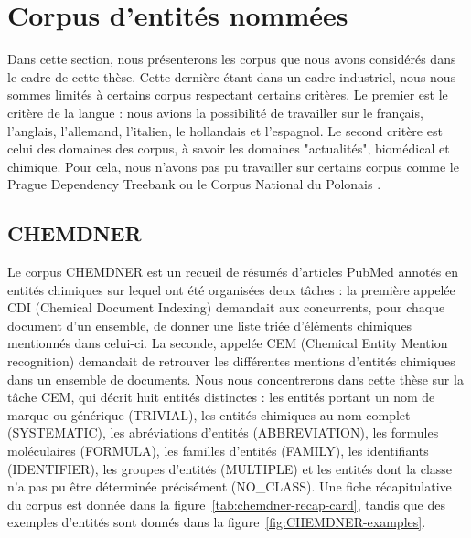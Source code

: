 \documentclass[12pt,a4paper,times,twoside,openright]{report}
\begin{document}
    
    \section{Corpus d'entités nommées}
    \label{sec:named-entity-corpora}
    
    Dans cette section, nous présenterons les corpus que nous avons considérés dans le cadre de cette thèse. Cette dernière étant dans un cadre industriel, nous nous sommes limités à certains corpus respectant certains critères. Le premier est le critère de la langue : nous avions la possibilité de travailler sur le français, l'anglais, l'allemand, l'italien, le hollandais et l'espagnol. Le second critère est celui des domaines des corpus, à savoir les domaines "actualités", biomédical et chimique. Pour cela, nous n'avons pas pu travailler sur certains corpus comme le Prague Dependency Treebank \citep{bejvcek2010annotation} ou le Corpus National du Polonais \citep{savary2010towards}.
    
        \subsection{CHEMDNER}
        \label{subsec:corpus-CHEMDNER}
Le corpus CHEMDNER \citep{krallinger2015chemdner} est un recueil de résumés d'articles PubMed annotés en entités chimiques sur lequel ont été organisées deux tâches : la première appelée CDI (Chemical Document Indexing) demandait aux concurrents, pour chaque document d'un ensemble, de donner une liste triée d'éléments chimiques mentionnés dans celui-ci. La seconde, appelée CEM (Chemical Entity Mention recognition) demandait de retrouver les différentes mentions d'entités chimiques dans un ensemble de documents. Nous nous concentrerons dans cette thèse sur la tâche CEM, qui décrit huit entités distinctes : les entités portant un nom de marque ou générique (TRIVIAL), les entités chimiques au nom complet (SYSTEMATIC), les abréviations d'entités (ABBREVIATION), les formules moléculaires (FORMULA), les familles d'entités (FAMILY), les identifiants (IDENTIFIER), les groupes d'entités (MULTIPLE) et les entités dont la classe n'a pas pu être déterminée précisément (NO\_CLASS). Une fiche récapitulative du corpus est donnée dans la figure\ \ref{tab:chemdner-recap-card}, tandis que des exemples d'entités sont donnés dans la figure\ \ref{fig:CHEMDNER-examples}.
\end{document}
